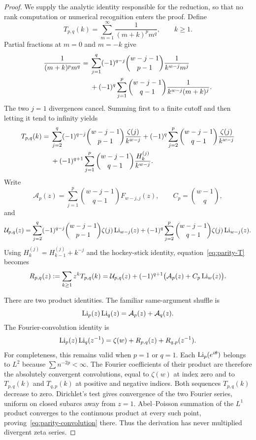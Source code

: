 \begin{proof}
We supply the analytic identity responsible for the reduction, so that no
rank computation or numerical recognition enters the proof. Define
\[
 T_{p,q}(k)=\sum_{m=1}^{\infty}\frac1{(m+k)^p m^q},\qquad k\ge1.
\]
Partial fractions at $m=0$ and $m=-k$ give
\begin{align}
 \frac1{(m+k)^p m^q}
 ={}&\sum_{j=1}^{q}(-1)^{q-j}
       \binom{w-j-1}{p-1}\frac1{k^{w-j}m^j}\notag\\
 &+(-1)^q\sum_{j=1}^{p}
       \binom{w-j-1}{q-1}\frac1{k^{w-j}(m+k)^j}.
 \label{eq:parity-pf}
\end{align}
The two $j=1$ divergences cancel. Summing first to a finite cutoff and
then letting it tend to infinity yields
\begin{align}
 T_{p,q}(k)={}&
 \sum_{j=2}^{q}(-1)^{q-j}\binom{w-j-1}{p-1}
                \frac{\zeta(j)}{k^{w-j}}
 +(-1)^q\sum_{j=2}^{p}\binom{w-j-1}{q-1}
                \frac{\zeta(j)}{k^{w-j}}\notag\\
 &+(-1)^{q+1}\sum_{j=1}^{p}\binom{w-j-1}{q-1}
                \frac{H_k^{(j)}}{k^{w-j}}.
 \label{eq:parity-T}
\end{align}
Write
\[
 \mathcal A_p(z)=\sum_{j=1}^{p}\binom{w-j-1}{q-1}F_{w-j,j}(z),
 \qquad C_p=\binom{w-1}{q},
\]
and
\[
 \mathcal U_{p,q}(z)=
 \sum_{j=2}^{q}(-1)^{q-j}\binom{w-j-1}{p-1}
                 \zeta(j)\operatorname{Li}_{w-j}(z)
 +(-1)^q\sum_{j=2}^{p}\binom{w-j-1}{q-1}
                 \zeta(j)\operatorname{Li}_{w-j}(z).
\]
Using $H_k^{(j)}=H_{k-1}^{(j)}+k^{-j}$ and the hockey-stick identity,
equation~\eqref{eq:parity-T} becomes
\begin{equation}\label{eq:parity-R}
 R_{p,q}(z):=\sum_{k\ge1}z^kT_{p,q}(k)
 =\mathcal U_{p,q}(z)+(-1)^{q+1}
        \bigl(\mathcal A_p(z)+C_p\operatorname{Li}_w(z)\bigr).
\end{equation}

There are two product identities. The familiar same-argument shuffle is
\begin{equation}\label{eq:parity-shuffle}
 \operatorname{Li}_p(z)\operatorname{Li}_q(z)=\mathcal A_p(z)+\mathcal A_q(z).
\end{equation}
The Fourier-convolution identity is
\begin{equation}\label{eq:parity-convolution}
 \operatorname{Li}_p(z)\operatorname{Li}_q(z^{-1})
       =\zeta(w)+R_{p,q}(z)+R_{q,p}(z^{-1}).
\end{equation}
For completeness, this remains valid when $p=1$ or $q=1$. Each
$\operatorname{Li}_p(e^{i\theta})$ belongs to $L^2$ because $\sum n^{-2p}<\infty$.
The Fourier coefficients of their product are therefore the absolutely
convergent convolutions, equal to $\zeta(w)$ at index zero and to
$T_{p,q}(k)$ and $T_{q,p}(k)$ at positive and negative indices. Both
sequences $T_{p,q}(k)$ decrease to zero. Dirichlet's test gives convergence
of the two Fourier series, uniform on closed subarcs away from $z=1$.
Abel--Poisson summation of the $L^1$ product converges to the continuous
product at every such point, proving~\eqref{eq:parity-convolution} there.
Thus the derivation has never multiplied divergent zeta series.


\end{proof}

